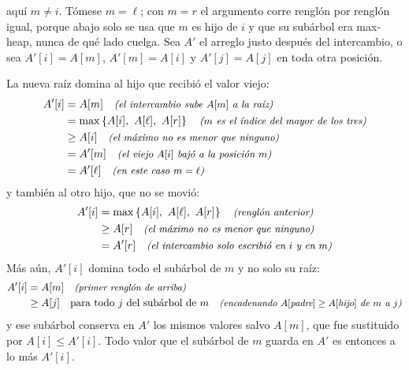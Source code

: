 \documentclass[11pt,letterpaper]{article}
\begin{document}
 aquí $m \ne i$.
Tómese $m = \ell$; con $m = r$ el argumento corre renglón por renglón
igual, porque abajo solo se usa que $m$ es hijo de $i$ y que su
subárbol era max-heap, nunca de qué lado cuelga. Sea $A'$ el arreglo
justo después del intercambio, o sea $A'[i] = A[m]$, $A'[m] = A[i]$ y
$A'[j] = A[j]$ en toda otra posición.

La nueva raíz domina al hijo que recibió el valor viejo:
\begin{align*}
  A'[i] &= A[m]
          \quad\text{\small\itshape (el intercambio sube $A[m]$ a la raíz)} \\
        &= \max\left\{ A[i],\ A[\ell],\ A[r] \right\}
          \quad\text{\small\itshape ($m$ es el índice del mayor de los tres)} \\
        &\ge A[i]
          \quad\text{\small\itshape (el máximo no es menor que ninguno)} \\
        &= A'[m]
          \quad\text{\small\itshape (el viejo $A[i]$ bajó a la posición $m$)} \\
        &= A'[\ell]
          \quad\text{\small\itshape (en este caso $m = \ell$)}
\end{align*}
y también al otro hijo, que no se movió:
\begin{align*}
  A'[i] &= \max\left\{ A[i],\ A[\ell],\ A[r] \right\}
          \quad\text{\small\itshape (renglón anterior)} \\
        &\ge A[r]
          \quad\text{\small\itshape (el máximo no es menor que ninguno)} \\
        &= A'[r]
          \quad\text{\small\itshape (el intercambio solo escribió en $i$ y en $m$)}
\end{align*}
Más aún, $A'[i]$ domina todo el subárbol de $m$ y no solo su raíz:
\begin{align*}
  A'[i] &= A[m]
          \quad\text{\small\itshape (primer renglón de arriba)} \\
        &\ge A[j] \quad \text{para todo $j$ del subárbol de $m$}
          \quad\text{\small\itshape (encadenando $A[\text{padre}] \ge A[\text{hijo}]$ de
                 $m$ a $j$)}
\end{align*}
y ese subárbol conserva en $A'$ los mismos valores salvo $A[m]$, que
fue sustituido por $A[i] \le A'[i]$. Todo valor que el subárbol de $m$
guarda en $A'$ es entonces a lo más $A'[i]$.
\end{document}
